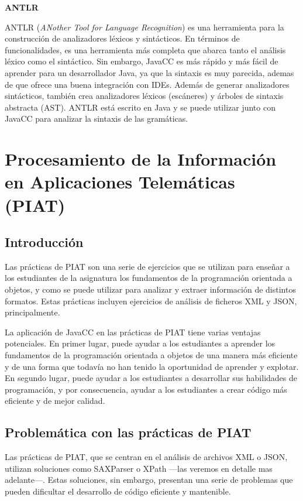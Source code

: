 \textbf{ANTLR}

ANTLR (\textit{ANother Tool for Language Recognition}) es una herramienta para la construcción de analizadores léxicos y sintácticos. En términos de funcionalidades, es una herramienta más completa que abarca tanto el análisis léxico como el sintáctico. Sin embargo, JavaCC es más rápido y más fácil de aprender para un desarrollador Java, ya que la sintaxis es muy parecida, ademas de que ofrece una buena integración con IDEs\cite{antlr}. Además de generar analizadores sintácticos, también crea analizadores léxicos (escáneres) y árboles de sintaxis abstracta (AST).
ANTLR está escrito en Java y se puede utilizar junto con JavaCC para analizar la sintaxis de las gramáticas.

\section{Procesamiento de la Información en Aplicaciones Telemáticas (PIAT)}
\subsection{Introducción}
Las prácticas de PIAT son una serie de ejercicios que se utilizan para enseñar a los estudiantes de la asignatura los fundamentos de la programación orientada a objetos, y como se puede utilizar para analizar y extraer información de distintos formatos. Estas prácticas incluyen ejercicios de análisis de ficheros XML y JSON, principalmente.

La aplicación de JavaCC en las prácticas de PIAT tiene varias ventajas potenciales. En primer lugar, puede ayudar a los estudiantes a aprender los fundamentos de la programación orientada a objetos de una manera más eficiente y de una forma que todavía no han tenido la oportunidad de aprender y explotar. En segundo lugar, puede ayudar a los estudiantes a desarrollar sus habilidades de programación, y por consecuencia, ayudar a los estudiantes a crear código más eficiente y de mejor calidad.
\subsection{Problemática con las prácticas de PIAT}

Las prácticas de PIAT, que se centran en el análisis de archivos XML o JSON,  utilizan soluciones como SAXParser o XPath ---las veremos en detalle mas adelante---. Estas soluciones, sin embargo, presentan una serie de problemas que pueden dificultar el desarrollo de código eficiente y mantenible.

